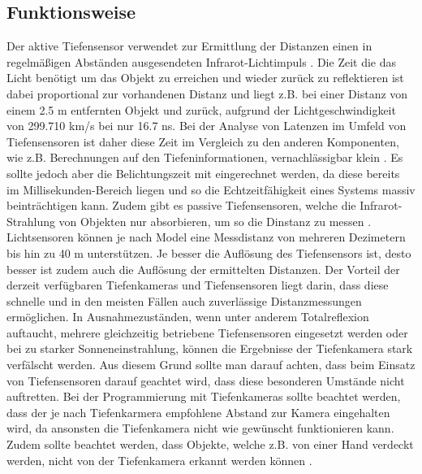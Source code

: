 \subsection{Funktionsweise}
Der aktive Tiefensensor verwendet zur Ermittlung der Distanzen einen in regelmäßigen Abständen ausgesendeten Infrarot-Lichtimpuls \cite{noauthor_understanding_infrared_sensors_nodate}. Die Zeit die das Licht benötigt um das Objekt zu erreichen und wieder zurück zu reflektieren ist dabei proportional zur vorhandenen Distanz und liegt z.B. bei einer Distanz von einem \num{2,5} m entfernten Objekt und zurück, aufgrund der Lichtgeschwindigkeit von \num{299,710} km/s bei nur \num{16,7} ns. Bei der Analyse von Latenzen im Umfeld von Tiefensensoren ist daher diese Zeit im Vergleich zu den anderen Komponenten, wie z.B. Berechnungen auf den Tiefeninformationen, vernachlässigbar klein \cite{noauthor_tof-kamera_2019}. Es sollte jedoch aber die Belichtungszeit mit eingerechnet werden, da diese bereits im Millisekunden-Bereich liegen und so die Echtzeitfähigkeit eines Systems massiv beinträchtigen kann. Zudem gibt es passive Tiefensensoren, welche die Infrarot-Strahlung von Objekten nur absorbieren, um so die Dinstanz zu messen \cite{noauthor_understanding_infrared_sensors_nodate}. Lichtsensoren können je nach Model eine Messdistanz von mehreren Dezimetern bis hin zu 40 m unterstützen. Je besser die Auflösung des Tiefensensors ist, desto besser ist zudem auch die Auflösung der ermittelten Distanzen. Der Vorteil der derzeit verfügbaren Tiefenkameras und Tiefensensoren liegt darin, dass diese schnelle und in den meisten Fällen auch zuverlässige Distanzmessungen ermöglichen. In Ausnahmezuständen, wenn unter anderem Totalreflexion auftaucht, mehrere gleichzeitig betriebene Tiefensensoren eingesetzt werden oder bei zu starker Sonneneinstrahlung, können die Ergebnisse der Tiefenkamera stark verfälscht werden. Aus diesem Grund sollte man darauf achten, dass beim Einsatz von Tiefensensoren darauf geachtet wird, dass diese besonderen Umstände nicht auftretten. Bei der Programmierung mit Tiefenkameras sollte beachtet werden, dass der je nach Tiefenkarmera empfohlene Abstand zur Kamera eingehalten wird, da ansonsten die Tiefenkamera nicht wie gewünscht funktionieren kann. Zudem sollte beachtet werden, dass Objekte, welche z.B. von einer Hand verdeckt werden, nicht von der Tiefenkamera erkannt werden können \cite{noauthor_tof-kamera_2019}.

